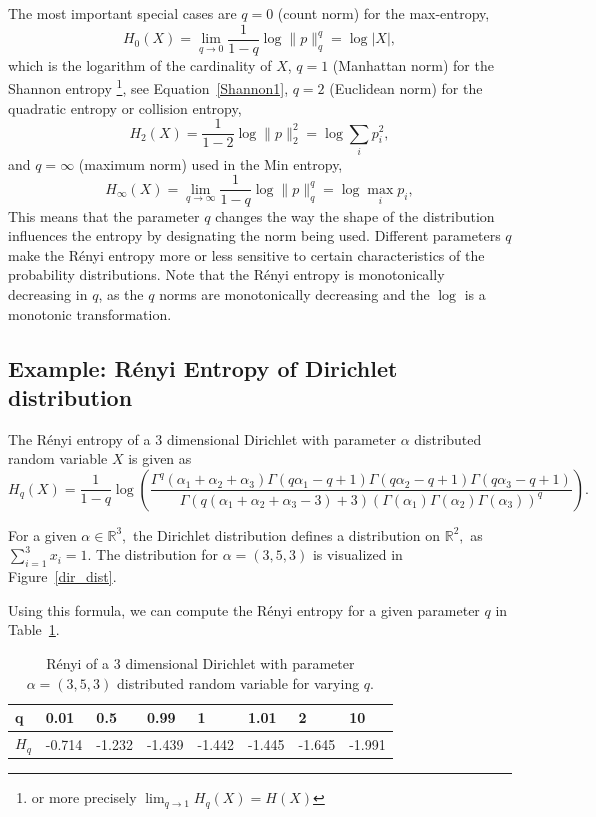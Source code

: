 \documentclass[12pt, twoside]{article}
\newcommand{\R}{\mathbb{R}}
\newcommand{\1}{\mathbb{1}}
\begin{document}
The most important special cases are $q = 0$ (count norm) for the max-entropy,
$$ 
H_0(X) = \lim_{q \to 0} \frac{1}{1 - q} \log \| p \|_q^q =  \log |X|,
$$
which is the logarithm of the cardinality of $X$,
$ q = 1 $ (Manhattan norm) for the Shannon entropy \footnote{or more precisely $\lim_{q \to 1} H_q(X) = H(X)$}, see Equation~\eqref{Shannon1},  $ q = 2 $ (Euclidean norm)  for the quadratic entropy or collision entropy, 
$$ 
H_2(X) = \frac{1}{1 - 2} \log \| p \|_2^2 = \log \sum_{i} p_i^2,
$$
and $q = \infty$ (maximum norm) used in the Min entropy,
$$ 
H_\infty(X) = \lim_{q \to \infty} \frac{1}{1 - q} \log \| p \|_q^q = \log \max_{i} p_i,
$$
This means that the parameter $ q $ changes the way the shape of the distribution influences the entropy by designating the norm being used. Different parameters $q$ make the R\'enyi entropy more or less sensitive to certain characteristics of the probability distributions.
Note that the R\'enyi  entropy is monotonically decreasing in $q$, as the $q$ norms are monotonically decreasing and the $\log$ is a monotonic transformation. 

\subsection{Example: R\'enyi Entropy of Dirichlet distribution}
The R\'enyi entropy of a $3$ dimensional Dirichlet with parameter $\alpha$ distributed random variable $X$ is given as
$$H_q(X) = \frac{1}{1 - q} \log(\frac{\Gamma^q(\alpha_1 + \alpha_2 + \alpha_3) \Gamma(q \alpha_1 - q + 1) \Gamma(q \alpha_2 - q + 1) \Gamma(q \alpha_3 - q + 1)}{\Gamma(q (\alpha_1 + \alpha_2 + \alpha_3 - 3) + 3) (\Gamma(\alpha_1) \Gamma(\alpha_2) \Gamma(\alpha_3))^q}).$$

For a given $\alpha \in \R^3,$ the Dirichlet distribution defines a distribution on $\R^2,$ as $\sum_{i = 1}^3 x_i = 1$. The distribution for $\alpha = (3, 5, 3)$ is visualized in Figure~\ref{dir_dist}.



Using this formula, we can compute the R\'enyi entropy for a given parameter $q$ in Table~\ref{tab:renyi_ent}.
\begin{table}[]
\caption{R\'enyi of a 3 dimensional Dirichlet with parameter $\alpha = (3, 5, 3)$ distributed random variable for varying $q$.}
\begin{tabular}{l|lllllll}
q    & 0.01   & 0.5    & 0.99                       & 1      & 1.01   & 2      & 10     \\ \hline
$H_q$ & -0.714 & -1.232 & \multicolumn{1}{r}{-1.439} & -1.442 & -1.445 & -1.645 & -1.991
\end{tabular}
\label{tab:renyi_ent}
\end{table}
\end{document}
